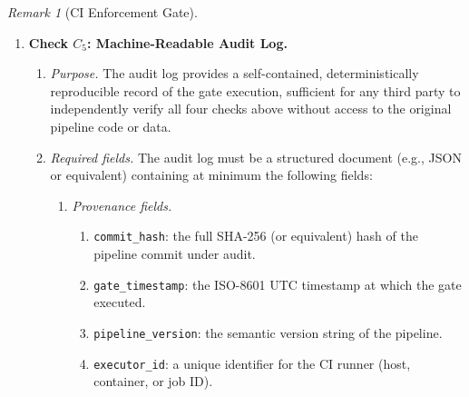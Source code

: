 \documentclass[12pt,openany]{book}
\numberwithin{equation}{chapter}
\theoremstyle{plain}
\theoremstyle{definition}
\theoremstyle{remark}
\newtheorem{remark}[theorem]{Remark}
\numberwithin{equation}{chapter}
\theoremstyle{plain}
\begin{document}
\begin{remark}[CI Enforcement Gate]
\begin{enumerate}
\begin{enumerate}
  \end{enumerate}

  \item \textbf{Check $C_{5}$: Machine-Readable Audit Log.}
  \label{ci:auditlog}

  \begin{enumerate}

    \item \emph{Purpose.}
          The audit log provides a self-contained,
          deterministically reproducible record of the gate
          execution, sufficient for any third party to
          independently verify all four checks above without
          access to the original pipeline code or data.

    \item \emph{Required fields.}
          The audit log must be a structured document
          (e.g., JSON or equivalent) containing at minimum
          the following fields:
    \begin{enumerate}

      \item \emph{Provenance fields.}
      \begin{enumerate}
        \item \texttt{commit\_hash}: the full
              SHA-256 (or equivalent) hash of the
              pipeline commit under audit.
        \item \texttt{gate\_timestamp}: the
              ISO-8601 UTC timestamp at which the
              gate executed.
        \item \texttt{pipeline\_version}: the
              semantic version string of the
              pipeline.
        \item \texttt{executor\_id}: a
              unique identifier for the CI runner
              (host, container, or job ID).
      \end{enumerate}


\end{enumerate}
\end{enumerate}
\end{enumerate}
\end{remark}
\end{document}
